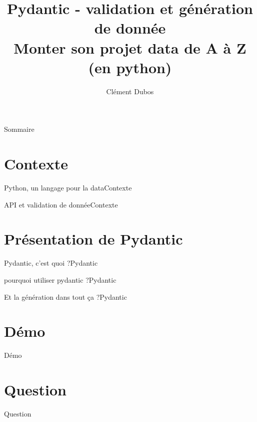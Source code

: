 \documentclass[aspectratio=169, xetex, 12pt]{beamer}
\title{Pydantic - validation et génération de donnée \\ \Large Monter son projet data de A à Z (en python)}
\author{Clément Dubos}
\institute{Extia}
\date{\displaydate{date}}
\begin{document}
    \maketitle

    \begin{frame}{Sommaire}
        \hfill
        \parbox[t]{.9\textwidth}{
            \begin{minipage}[c][0.2\textheight]{\textwidth}
                \Large
                \tableofcontents
            \end{minipage}
        }
    \end{frame}

    \section{Contexte}

    \begin{frame}{Python, un langage pour la data}{Contexte}
    \end{frame}

    \begin{frame}{API et validation de donnée}{Contexte}
    \end{frame}

    \section{Présentation de Pydantic}
    \begin{frame}{Pydantic, c'est quoi ?}{Pydantic}
    \end{frame}

    \begin{frame}{pourquoi utiliser pydantic ?}{Pydantic}
    \end{frame}

    \begin{frame}{Et la génération dans tout ça ?}{Pydantic}
    \end{frame}

    \section{Démo}
    \begin{frame}{Démo}
    \end{frame}

    \section{Question}
    \begin{frame}{Question}
    \end{frame}
\end{document}
